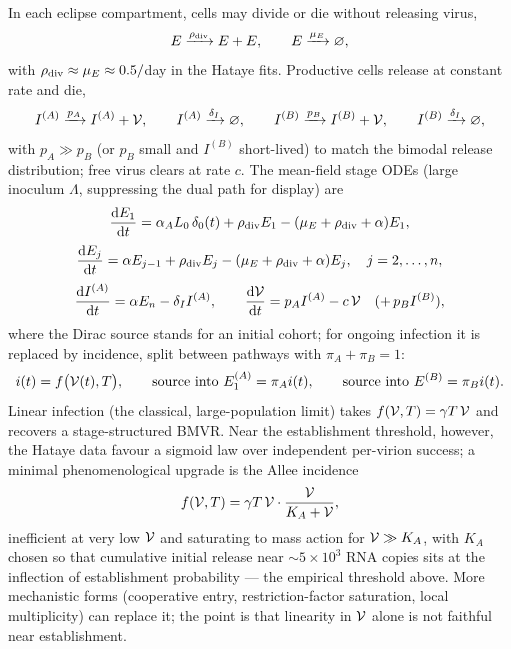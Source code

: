 In each eclipse compartment, cells may divide or die without releasing
virus,
\begin{equation}
E\xrightarrow{\rho_{\rm div}}E+E,
\qquad
E\xrightarrow{\mu_E}\varnothing,
\end{equation}
with $\rho_{\rm div}\approx\mu_E\approx0.5/$day in the Hataye fits.
Productive cells release at constant rate and die,
\begin{equation}
I^{(A)}\xrightarrow{p_A}I^{(A)}+\mathcal{V},
\qquad
I^{(A)}\xrightarrow{\delta_I}\varnothing,
\qquad
I^{(B)}\xrightarrow{p_B}I^{(B)}+\mathcal{V},
\qquad
I^{(B)}\xrightarrow{\delta_I}\varnothing,
\end{equation}
with $p_A\gg p_B$ (or $p_B$ small and $I^{(B)}$ short-lived) to match the
bimodal release distribution; free virus clears at rate $c$. The
mean-field stage ODEs (large inoculum $\Lambda$, suppressing the dual path
for display) are
\begin{equation}
\displaystyle\frac{{\rm d} E_1}{{\rm d} t}=\alpha_A L_0\,\delta_0(t)+\rho_{\rm div}E_1
-(\mu_E+\rho_{\rm div}+\alpha)E_1,
\end{equation}
\begin{equation}
\displaystyle\frac{{\rm d} E_j}{{\rm d} t}=\alpha E_{j-1}+\rho_{\rm div}E_j
-(\mu_E+\rho_{\rm div}+\alpha)E_j,\quad j=2,\dots,n,
\end{equation}
\begin{equation}
\displaystyle\frac{{\rm d} I^{(A)}}{{\rm d} t}=\alpha E_n-\delta_I I^{(A)},
\qquad
\displaystyle\frac{{\rm d} \mathcal{V}}{{\rm d} t}=p_A I^{(A)}-c\,\mathcal{V}
\quad(+\,p_B I^{(B)}),
\end{equation}
where the Dirac source stands for an initial cohort; for ongoing infection
it is replaced by incidence, split between pathways with
$\pi_A+\pi_B=1$:
\begin{equation}
i(t)=f\bigl(\mathcal{V}(t),T\bigr),
\qquad
\text{source into }E_1^{(A)}=\pi_A i(t),
\qquad
\text{source into }E^{(B)}=\pi_B i(t).
\end{equation}
Linear infection (the classical, large-population limit) takes
$f(\mathcal{V},T)=\gamma T\,\mathcal{V}$ and recovers a stage-structured BMVR. Near
the establishment threshold, however, the Hataye data favour a sigmoid law
over independent per-virion success; a minimal phenomenological upgrade is
the Allee incidence
\begin{equation}
f(\mathcal{V},T)=\gamma T\,\mathcal{V}\cdot\frac{\mathcal{V}}{K_A+\mathcal{V}},
\end{equation}
inefficient at very low $\mathcal{V}$ and saturating to mass action for
$\mathcal{V}\gg K_A$, with $K_A$ chosen so that cumulative initial release near
$\sim5\times10^3$ RNA copies sits at the inflection of establishment
probability --- the empirical threshold above. More mechanistic forms
(cooperative entry, restriction-factor saturation, local multiplicity) can
replace it; the point is that linearity in $\mathcal{V}$ alone is not faithful
near establishment.

